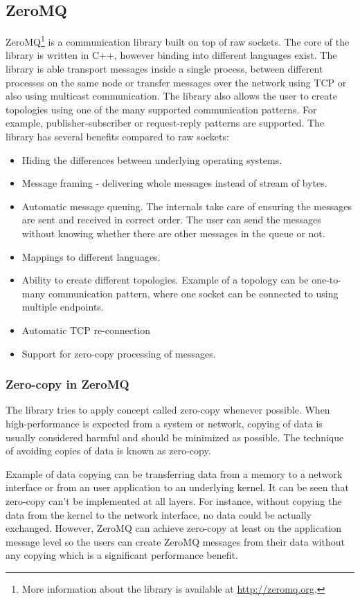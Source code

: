 \subsection{ZeroMQ}
\label{zeromq}
ZeroMQ\footnote{More information about the library is available at \url{http://zeromq.org}.} is a communication library built on top of raw sockets. The core of the library is written in C++, however binding into different languages exist. The library is able transport messages inside a single process, between different processes on the same node or transfer messages over the network using TCP or also using multicast communication. The library also allows the user to create topologies using one of the many supported communication patterns. For example, publisher-subscriber or request-reply patterns are supported. The library has several benefits compared to raw sockets:
\begin{itemize}
	\item Hiding the differences between underlying operating systems.
	\item Message framing - delivering whole messages instead of stream of bytes.
	\item Automatic message queuing. The internals take care of ensuring the messages are sent and received in correct order. The user can send the messages without knowing whether there are other messages in the queue or not.
	\item Mappings to different languages.
	\item Ability to create different topologies. Example of a topology can be one-to-many communication pattern, where one socket can be connected to using multiple endpoints. 
	\item Automatic TCP re-connection
	\item Support for zero-copy processing of messages.
\end{itemize}
\subsubsection{Zero-copy in ZeroMQ}
The library tries to apply concept called zero-copy whenever possible. When high-performance is expected from a system or network, copying of data is usually considered harmful and should be minimized as possible. The technique of avoiding copies of data is known as zero-copy.

Example of data copying can be transferring data from a memory to a network interface or from an user application to an underlying kernel. It can be seen that zero-copy can't be implemented at all layers. For instance, without copying the data from the kernel to the network interface, no data could be actually exchanged. However, ZeroMQ can achieve zero-copy at least on the application message level so the users can create ZeroMQ messages from their data without any copying which is a significant performance benefit.
